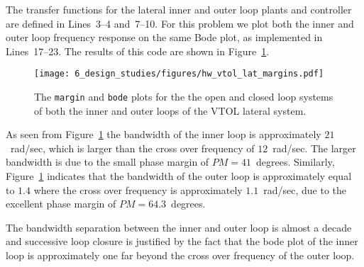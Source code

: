 The transfer functions for the lateral inner and outer loop plants and controller are defined in Lines~3--4 and~7--10.  For this problem we plot both the inner and outer loop frequency response on the same Bode plot, as implemented in Lines~17--23. The results of this code are shown in Figure~\ref{fig:hw_vtol_lat_margins}.
\begin{figure}[H]
   \centering
   \texttt{[image: 6\_design\_studies/figures/hw\_vtol\_lat\_margins.pdf]}
   \caption{The {\tt margin} and {\tt bode} plots for the the open and closed loop systems of both the inner and outer loops of the VTOL lateral system.}
   \label{fig:hw_vtol_lat_margins}
\end{figure} 
As seen from Figure~\ref{fig:hw_vtol_lat_margins} the bandwidth of the inner loop is approximately $21$~rad/sec, which is larger than the cross over frequency of $12$~rad/sec.  The larger bandwidth is due to the small phase margin of $PM=41$~degrees.
%
Similarly, Figure~\ref{fig:hw_vtol_lat_margins} indicates that the bandwidth of the outer loop is approximately equal to $1.4$ where the cross over frequency is approximately $1.1$~rad/sec, due to the excellent phase margin of $PM=64.3$~degrees.

The bandwidth separation between the inner and outer loop is almost a decade and successive loop closure is justified by the fact that the bode plot of the inner loop is approximately one far beyond the cross over frequency of the outer loop.
